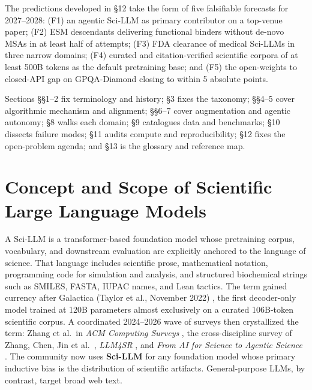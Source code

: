 \documentclass{article}
\begin{document}
The predictions developed in §12 take the form of five falsifiable forecasts for 2027--2028: (F1) an agentic Sci-LLM as primary contributor on a top-venue paper; (F2) ESM descendants delivering functional binders without de-novo MSAs in at least half of attempts; (F3) FDA clearance of medical Sci-LLMs in three narrow domains; (F4) curated and citation-verified scientific corpora of at least 500B tokens as the default pretraining base; and (F5) the open-weights to closed-API gap on GPQA-Diamond closing to within 5 absolute points.

Sections §§1--2 fix terminology and history; §3 fixes the taxonomy; §§4--5 cover algorithmic mechanism and alignment; §§6--7 cover augmentation and agentic autonomy; §8 walks each domain; §9 catalogues data and benchmarks; §10 dissects failure modes; §11 audits compute and reproducibility; §12 fixes the open-problem agenda; and §13 is the glossary and reference map.

\section{Concept and Scope of Scientific Large Language Models}\label{concept-and-scope-of-scientific-large-language-models}

A Sci-LLM is a transformer-based foundation model whose pretraining corpus, vocabulary, and downstream evaluation are explicitly anchored to the language of science. That language includes scientific prose, mathematical notation, programming code for simulation and analysis, and structured biochemical strings such as SMILES, FASTA, IUPAC names, and Lean tactics. The term gained currency after Galactica (Taylor et al., November 2022) \cite{taylor2022arxiv2211090852022}, the first decoder-only model trained at 120B parameters almost exclusively on a curated 106B-token scientific corpus. A coordinated 2024--2026 wave of surveys then crystallized the term: Zhang et al.~in \emph{ACM Computing Surveys} \cite{zhang2025scientificlargelan}, the cross-discipline survey of Zhang, Chen, Jin et al.~\cite{zhang2024acomprehensivesurv}, \emph{LLM4SR} \cite{luo2025llm4srasurveyonlar}, and \emph{From AI for Science to Agentic Science} \cite{wei2025fromaiforscienceto}. The community now uses \textbf{Sci-LLM} for any foundation model whose primary inductive bias is the distribution of scientific artifacts. General-purpose LLMs, by contrast, target broad web text.
\end{document}
